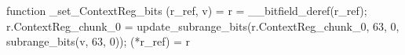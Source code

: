 function _set_ContextReg_bits (r_ref, v) = {
    r = __bitfield_deref(r_ref);
    r.ContextReg_chunk_0 = update_subrange_bits(r.ContextReg_chunk_0, 63, 0, subrange_bits(v, 63, 0));
    (*r_ref) = r
}
